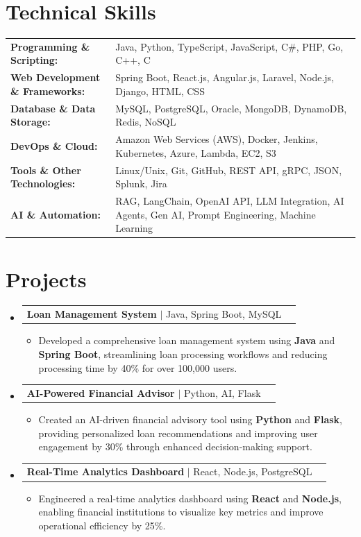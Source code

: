 \documentclass[letterpaper,10pt]{article}
\makeatletter
\newcommand{\resumeItem}[1]{
  \item{\fontsize{8pt}{9pt}\selectfont
    #1 \vspace{-3pt}
  }
}
\newcommand{\resumeProjectHeading}[2]{
    \item
    \begin{tabular*}{1.001\textwidth}{l@{\extracolsep{\fill}}r}
      \fontsize{8.5pt}{10pt}#1 & \textbf{\fontsize{8.5pt}{10pt} #2}\\
    \end{tabular*}\vspace{-7pt}
}
\newcommand{\resumeSubHeadingListStart}{\begin{itemize}[leftmargin=0pt, label={}]}
\newcommand{\resumeSubHeadingListEnd}{\end{itemize}}
\newcommand{\resumeItemListStart}{\begin{itemize}[leftmargin=*]}
\newcommand{\resumeItemListEnd}{\end{itemize}\vspace{-5pt}}
\makeatother
\begin{document}
\section{Technical Skills}
        \vspace{-14pt}
        \begin{table}[h]
            \fontsize{8pt}{9pt}\selectfont
            \begin{tabular}{p{0.3\linewidth} p{0.7\linewidth}}
                \textbf{Programming \& Scripting:} & Java, Python, TypeScript, JavaScript, C\#, PHP, Go, C++, C \\
                \textbf{Web Development \& Frameworks:} & Spring Boot, React.js, Angular.js, Laravel, Node.js, Django, HTML, CSS \\
                \textbf{Database \& Data Storage:} & MySQL, PostgreSQL, Oracle, MongoDB, DynamoDB, Redis, NoSQL \\
                \textbf{DevOps \& Cloud:} & Amazon Web Services (AWS), Docker, Jenkins, Kubernetes, Azure, Lambda, EC2, S3 \\
                \textbf{Tools \& Other Technologies:} & Linux/Unix, Git, GitHub, REST API, gRPC, JSON, Splunk, Jira \\
                \textbf{AI \& Automation:} & RAG, LangChain, OpenAI API, LLM Integration, AI Agents, Gen AI, Prompt Engineering, Machine Learning \\
            \end{tabular}
        \end{table}
 \vspace{-18pt}

\section{Projects}
    \vspace{-5pt}
    \resumeSubHeadingListStart
          \resumeProjectHeading
            {\textbf{Loan Management System} $|$ Java, Spring Boot, MySQL}{}
            \resumeItemListStart
                \resumeItem{Developed a comprehensive loan management system using \textbf{Java} and \textbf{Spring Boot}, streamlining loan processing workflows and reducing processing time by 40\% for over 100,000 users.}
            \resumeItemListEnd
        \vspace{-12pt}
    
        \resumeProjectHeading
            {\textbf{AI-Powered Financial Advisor} $|$ Python, AI, Flask}{}
        \resumeItemListStart
                \resumeItem{Created an AI-driven financial advisory tool using \textbf{Python} and \textbf{Flask}, providing personalized loan recommendations and improving user engagement by 30\% through enhanced decision-making support.}
        \resumeItemListEnd
      \vspace{-12pt}
      \resumeProjectHeading
        {\textbf{Real-Time Analytics Dashboard} $|$ React, Node.js, PostgreSQL}{}
    \resumeItemListStart
            \resumeItem{Engineered a real-time analytics dashboard using \textbf{React} and \textbf{Node.js}, enabling financial institutions to visualize key metrics and improve operational efficiency by 25\%.}
    \resumeItemListEnd
    \resumeSubHeadingListEnd
\end{document}
